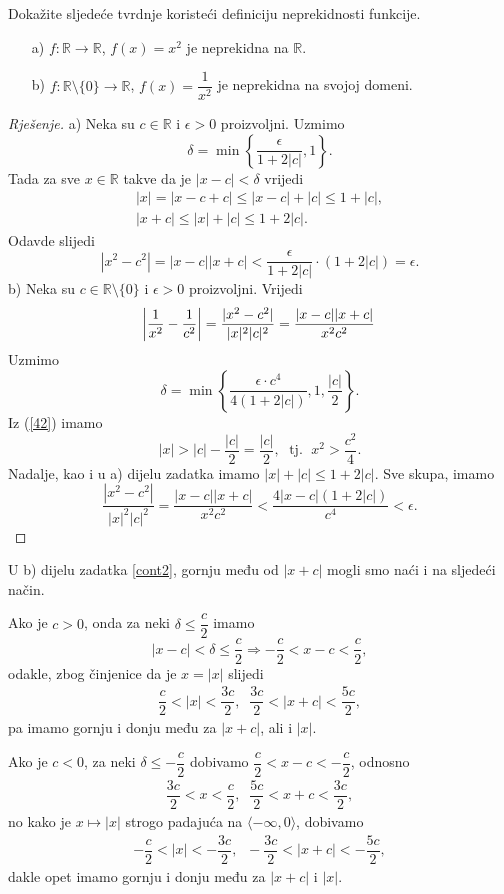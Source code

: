\begin{exercise}
\label{cont2}
Dokažite sljedeće tvrdnje koristeći definiciju neprekidnosti funkcije.
\begin{itemize}
\item[a)] $f : \mathbb{R}\to \mathbb{R}$, $f(x)=x^2$ je neprekidna na $\mathbb{R}$.
\item[b)] $f : \mathbb{R}\setminus\{0\}\to \mathbb{R}$, $f(x)=\dfrac{1}{x^2}$ je neprekidna na svojoj domeni.
\end{itemize}
\end{exercise}
\begin{proof}[Rješenje]
a) Neka su $c\in \mathbb{R}$ i $\epsilon>0$ proizvoljni. Uzmimo $$\delta=\min\left\{\dfrac{\epsilon}{1+2|c|}, 1\right\}.$$ 
Tada za sve $x\in \mathbb{R}$ takve da je $|x-c|<\delta$ vrijedi 
\begin{gather*}
|x|=|x-c+c|\leq |x-c|+|c|\leq 1+|c|,\\
|x+c|\leq |x|+|c|\leq 1+2|c|.
\end{gather*}
Odavde slijedi
$$|x^2-c^2|=|x-c||x+c|<\dfrac{\epsilon}{1+2|c|}\cdot(1+2|c|)=\epsilon.$$
b) Neka su $c\in \mathbb{R}\setminus\{0\}$ i $\epsilon>0$ proizvoljni. Vrijedi
$$\abs{\dfrac{1}{x^2}-\dfrac{1}{c^2}}=\dfrac{|x^2-c^2|}{|x|^2|c|^2}=\dfrac{|x-c||x+c|}{x^2c^2}$$
Uzmimo
$$\delta=\min\left\{\dfrac{\epsilon\cdot c^4}{4\left(1+2|c|\right)}, 1, \dfrac{|c|}{2}\right\}.$$
Iz (\ref{42}) imamo $$|x|>|c|-\dfrac{|c|}{2}=\dfrac{|c|}{2},\; \text{ tj. }\; x^2>\dfrac{c^2}{4}.$$
Nadalje, kao i u a) dijelu zadatka imamo $|x|+|c|\leq 1+2|c|$. Sve skupa, imamo
$$\dfrac{|x^2-c^2|}{|x|^2|c|^2}=\dfrac{|x-c||x+c|}{x^2c^2}<\dfrac{4|x-c|(1+2|c|)}{c^4}<\epsilon.$$
\end{proof}
\begin{remark}
U b) dijelu zadatka \ref{cont2}, gornju među od $|x+c|$ mogli smo naći i na sljedeći način.

Ako je $c>0$, onda za neki $\delta\leq \dfrac{c}{2}$ imamo
$$|x-c|< \delta\leq \dfrac{c}{2} \Longrightarrow -\dfrac{c}{2}<x-c<\dfrac{c}{2},$$
odakle, zbog činjenice da je $x=|x|$ slijedi
\begin{gather}
\label{44}
\dfrac{c}{2}<|x|<\dfrac{3c}{2},\;\; \dfrac{3c}{2}<|x+c|<\dfrac{5c}{2},
\end{gather}
pa imamo gornju i donju među za $|x+c|$, ali i $|x|$.

Ako je $c<0$, za neki $\delta\leq -\dfrac{c}{2}$  dobivamo $\dfrac{c}{2}<x-c<-\dfrac{c}{2}$, odnosno 
\begin{gather*}
\dfrac{3c}{2}<x<\dfrac{c}{2},\;\; \dfrac{5c}{2}<x+c<\dfrac{3c}{2},
\end{gather*}
no kako je $x\mapsto |x|$ strogo padajuća na $\langle -\infty, 0\rangle$, dobivamo
\begin{gather*}
-\dfrac{c}{2}<|x|<-\dfrac{3c}{2},\;\; -\dfrac{3c}{2}<|x+c|<-\dfrac{5c}{2},
\end{gather*}
dakle opet imamo gornju i donju među za $|x+c|$ i $|x|$.
\end{remark}
